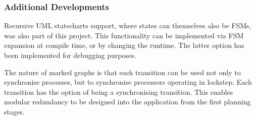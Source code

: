 \documentclass{beamer}
\begin{document}
	\begin{frame}
	\frametitle{Additional Developments}
	Recursive UML statecharts support, where states can themselves also be FSMs, was also part of this project. 
	This functionality can be implemented via FSM expansion at compile time, or by changing the runtime. 
	The latter option has been implemented for debugging purposes. 

	\vspace{1cm}

	The nature of marked graphs is that each transition can be used not only to synchronise processes, but to synchronise processors operating in lockstep. 
	Each transition has the option of being a synchronising transition. 
	This enables modular redundancy to be designed into the application from the first planning stages. 
	\end{frame}
\end{document}
